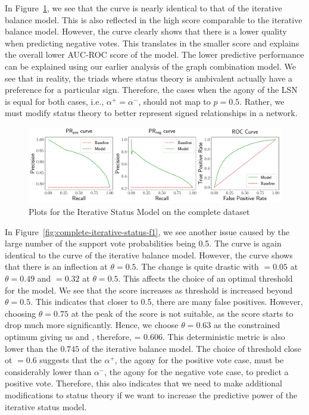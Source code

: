 In Figure~\ref{fig:complete-iterative-status}, we see that the \posPR curve is nearly identical to that of the iterative balance model.
This is also reflected in the high \aucposPR score comparable to the iterative balance model.
However, the \negPR curve clearly shows that there is a lower quality when predicting negative votes.
This translates in the smaller \aucnegPR score and explains the overall lower AUC-ROC score of the model.
The lower predictive performance can be explained using our earlier analysis of the graph combination model.
We see that in reality, the triads where status theory is ambivalent actually have a preference for a particular sign.
Therefore, the cases when the agony of the LSN is equal for both cases, i.e., $\alpha^{+}=\alpha^{-}$, should not map to $p=0.5$.
Rather, we must modify status theory to better represent signed relationships in a network.

\begin{figure}[htp]
    \centering
    \includegraphics[width=\textwidth]{images/iterative_Status.pdf}
    \caption{Plots for the Iterative Status Model on the complete \wikirfa dataset}
    \label{fig:complete-iterative-status}
\end{figure}

In Figure~\ref{fig:complete-iterative-status-f1}, we see another issue caused by the large number of the support vote probabilities being 0.5.
The \posF curve is again identical to the \posF curve of the iterative balance model.
However, the \negF curve shows that there is an inflection at $\theta=0.5$.
The change is quite drastic with \negF$=0.05$ at $\theta=0.49$ and \negF$=0.32$ at $\theta=0.5$. 
This affects the choice of an optimal threshold for the model.
We see that the \negF score increases as threshold is increased beyond $\theta=0.5$.
This indicates that closer to 0.5, there are many false positives.
However, choosing $\theta=0.75$ at the peak of the \negF score is not suitable, as the \posF score starts to drop much more significantly. 
Hence, we choose $\theta=0.63$ as the constrained optimum giving us  and , therefore, \macroF = 0.606. 
This deterministic metric is also lower than the $0.745$ of the iterative balance model.
The choice of threshold close ot $=0.6$ suggests that the $\alpha^{+}$, the agony for the positive vote case, must be considerably lower than $\alpha^{-}$, the agony for the negative vote case, to predict a positive vote.
Therefore, this also indicates that we need to make additional modifications to status theory if we want to increase the predictive power of the iterative status model.


